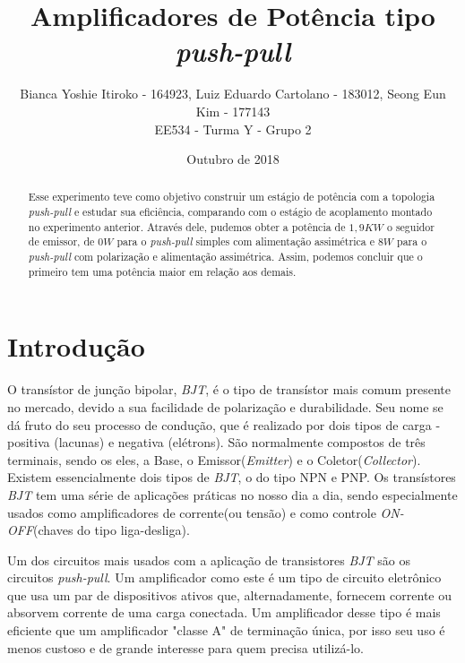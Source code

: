 \documentclass{pack}
\begin{document}
    \title{Amplificadores de Potência tipo \emph{push-pull}}
    \author{Bianca Yoshie Itiroko - 164923, Luiz Eduardo Cartolano - 183012, Seong Eun Kim - 177143 \\ EE534 - Turma Y - Grupo 2}
    \date{Outubro de 2018}
    
    \maketitle
    
    \begin{abstract}
        Esse experimento teve como objetivo construir um estágio de potência com a topologia \emph{push-pull} e estudar sua eficiência, comparando com o estágio de acoplamento montado no experimento anterior. Através dele, pudemos obter a potência de $1,9KW$ o seguidor de emissor, de $0W$ para o \emph{push-pull} simples com alimentação assimétrica e $8W$ para o \emph{push-pull} com polarização e alimentação assimétrica. Assim, podemos concluir que o primeiro tem uma potência maior em relação aos demais.
    \end{abstract}
    
    \section{Introdução}
        O transístor de junção bipolar, \emph{BJT}, é o tipo de transístor mais comum presente no mercado, devido a sua facilidade de polarização e durabilidade. Seu nome se dá fruto do seu processo de condução, que é realizado por dois tipos de carga - positiva (lacunas) e negativa (elétrons).  São normalmente compostos de três terminais, sendo os eles, a Base, o Emissor(\emph{Emitter}) e o Coletor(\emph{Collector}). Existem essencialmente dois tipos de \emph{BJT}, o do tipo NPN e PNP. Os transístores \emph{BJT} tem uma série de aplicações práticas no nosso dia a dia, sendo especialmente usados como amplificadores de corrente(ou tensão) e como controle \emph{ON-OFF}(chaves do tipo liga-desliga).
    
        Um dos circuitos mais usados com a aplicação de transistores \emph{BJT} são os circuitos \emph{push-pull}. Um amplificador como este é um tipo de circuito eletrônico que usa um par de dispositivos ativos que, alternadamente, fornecem corrente ou absorvem corrente de uma carga conectada. Um amplificador desse tipo é mais eficiente que um amplificador "classe A" de terminação única, por isso seu uso é menos custoso e de grande interesse para quem precisa utilizá-lo. 
    
\end{document}
